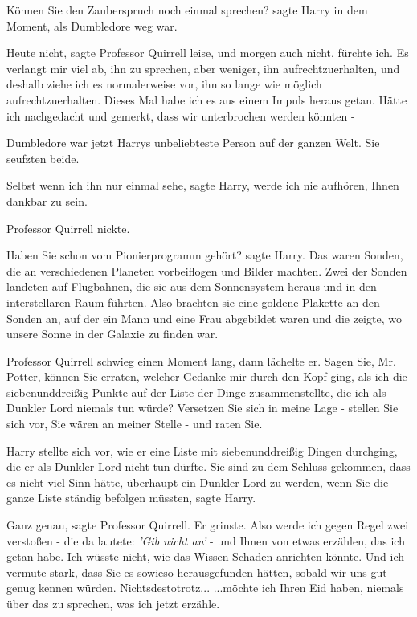 \glqq Können Sie den Zauberspruch noch einmal sprechen?\grqq{} sagte Harry in
dem Moment, als Dumbledore weg war.

\glqq Heute nicht\grqq{}, sagte Professor Quirrell leise, \glqq und morgen auch
nicht, fürchte ich. Es verlangt mir viel ab, ihn zu sprechen, aber weniger, ihn
aufrechtzuerhalten, und deshalb ziehe ich es normalerweise vor, ihn so lange wie
möglich aufrechtzuerhalten. Dieses Mal habe ich es aus einem Impuls heraus
getan. Hätte ich nachgedacht und gemerkt, dass wir unterbrochen werden könnten
-\grqq{}

Dumbledore war jetzt Harrys unbeliebteste Person auf der ganzen Welt. Sie
seufzten beide.

\glqq Selbst wenn ich ihn nur einmal sehe\grqq{}, sagte Harry, \glqq werde ich
nie aufhören, Ihnen dankbar zu sein.\grqq{}

Professor Quirrell nickte.

\glqq Haben Sie schon vom Pionierprogramm gehört?\grqq{} sagte Harry. \glqq Das
waren Sonden, die an verschiedenen Planeten vorbeiflogen und Bilder machten.
Zwei der Sonden landeten auf Flugbahnen, die sie aus dem Sonnensystem heraus und
in den interstellaren Raum führten. Also brachten sie eine goldene Plakette an
den Sonden an, auf der ein Mann und eine Frau abgebildet waren und die zeigte,
wo unsere Sonne in der Galaxie zu finden war.\grqq{}

Professor Quirrell schwieg einen Moment lang, dann lächelte er. \glqq Sagen Sie,
Mr. Potter, können Sie erraten, welcher Gedanke mir durch den Kopf ging, als ich
die siebenunddreißig Punkte auf der Liste der Dinge zusammenstellte, die ich als
Dunkler Lord niemals tun würde? Versetzen Sie sich in meine Lage - stellen Sie
sich vor, Sie wären an meiner Stelle - und raten Sie.\grqq{}

Harry stellte sich vor, wie er eine Liste mit siebenunddreißig Dingen durchging,
die er als Dunkler Lord nicht tun dürfte. \glqq Sie sind zu dem Schluss
gekommen, dass es nicht viel Sinn hätte, überhaupt ein Dunkler Lord zu werden,
wenn Sie die ganze Liste ständig befolgen müssten\grqq{}, sagte Harry.

\glqq Ganz genau\grqq{}, sagte Professor Quirrell. Er grinste. \glqq Also werde
ich gegen Regel zwei verstoßen - die da lautete: \emph{'Gib nicht an'} - und
Ihnen von etwas erzählen, das ich getan habe. Ich wüsste nicht, wie das Wissen
Schaden anrichten könnte. Und ich vermute stark, dass Sie es sowieso
herausgefunden hätten, sobald wir uns gut genug kennen würden.
Nichtsdestotrotz... ...möchte ich Ihren Eid haben, niemals über das zu sprechen,
was ich jetzt erzähle.\grqq{}

